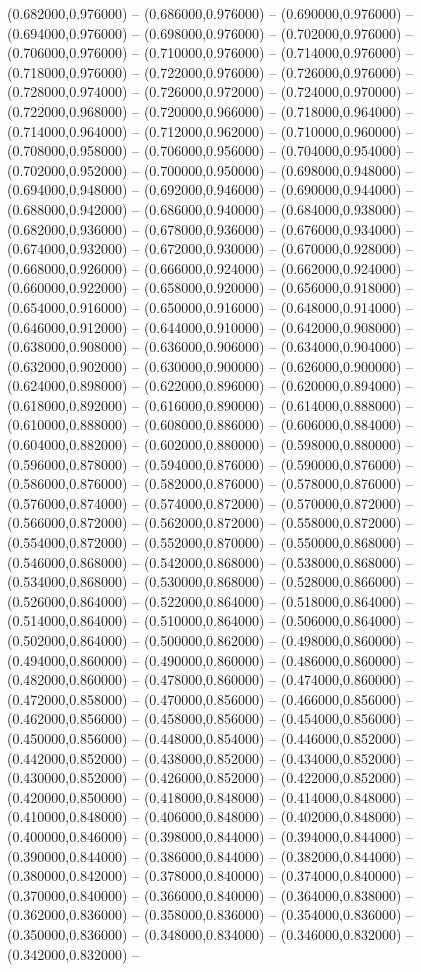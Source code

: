 (0.682000,0.976000) -- (0.686000,0.976000) -- (0.690000,0.976000) -- (0.694000,0.976000) -- (0.698000,0.976000) -- (0.702000,0.976000) -- (0.706000,0.976000) -- (0.710000,0.976000) -- (0.714000,0.976000) -- (0.718000,0.976000) -- (0.722000,0.976000) -- (0.726000,0.976000) -- (0.728000,0.974000) -- (0.726000,0.972000) -- (0.724000,0.970000) -- (0.722000,0.968000) -- (0.720000,0.966000) -- (0.718000,0.964000) -- (0.714000,0.964000) -- (0.712000,0.962000) -- (0.710000,0.960000) -- (0.708000,0.958000) -- (0.706000,0.956000) -- (0.704000,0.954000) -- (0.702000,0.952000) -- (0.700000,0.950000) -- (0.698000,0.948000) -- (0.694000,0.948000) -- (0.692000,0.946000) -- (0.690000,0.944000) -- (0.688000,0.942000) -- (0.686000,0.940000) -- (0.684000,0.938000) -- (0.682000,0.936000) -- (0.678000,0.936000) -- (0.676000,0.934000) -- (0.674000,0.932000) -- (0.672000,0.930000) -- (0.670000,0.928000) -- (0.668000,0.926000) -- (0.666000,0.924000) -- (0.662000,0.924000) -- (0.660000,0.922000) -- (0.658000,0.920000) -- (0.656000,0.918000) -- (0.654000,0.916000) -- (0.650000,0.916000) -- (0.648000,0.914000) -- (0.646000,0.912000) -- (0.644000,0.910000) -- (0.642000,0.908000) -- (0.638000,0.908000) -- (0.636000,0.906000) -- (0.634000,0.904000) -- (0.632000,0.902000) -- (0.630000,0.900000) -- (0.626000,0.900000) -- (0.624000,0.898000) -- (0.622000,0.896000) -- (0.620000,0.894000) -- (0.618000,0.892000) -- (0.616000,0.890000) -- (0.614000,0.888000) -- (0.610000,0.888000) -- (0.608000,0.886000) -- (0.606000,0.884000) -- (0.604000,0.882000) -- (0.602000,0.880000) -- (0.598000,0.880000) -- (0.596000,0.878000) -- (0.594000,0.876000) -- (0.590000,0.876000) -- (0.586000,0.876000) -- (0.582000,0.876000) -- (0.578000,0.876000) -- (0.576000,0.874000) -- (0.574000,0.872000) -- (0.570000,0.872000) -- (0.566000,0.872000) -- (0.562000,0.872000) -- (0.558000,0.872000) -- (0.554000,0.872000) -- (0.552000,0.870000) -- (0.550000,0.868000) -- (0.546000,0.868000) -- (0.542000,0.868000) -- (0.538000,0.868000) -- (0.534000,0.868000) -- (0.530000,0.868000) -- (0.528000,0.866000) -- (0.526000,0.864000) -- (0.522000,0.864000) -- (0.518000,0.864000) -- (0.514000,0.864000) -- (0.510000,0.864000) -- (0.506000,0.864000) -- (0.502000,0.864000) -- (0.500000,0.862000) -- (0.498000,0.860000) -- (0.494000,0.860000) -- (0.490000,0.860000) -- (0.486000,0.860000) -- (0.482000,0.860000) -- (0.478000,0.860000) -- (0.474000,0.860000) -- (0.472000,0.858000) -- (0.470000,0.856000) -- (0.466000,0.856000) -- (0.462000,0.856000) -- (0.458000,0.856000) -- (0.454000,0.856000) -- (0.450000,0.856000) -- (0.448000,0.854000) -- (0.446000,0.852000) -- (0.442000,0.852000) -- (0.438000,0.852000) -- (0.434000,0.852000) -- (0.430000,0.852000) -- (0.426000,0.852000) -- (0.422000,0.852000) -- (0.420000,0.850000) -- (0.418000,0.848000) -- (0.414000,0.848000) -- (0.410000,0.848000) -- (0.406000,0.848000) -- (0.402000,0.848000) -- (0.400000,0.846000) -- (0.398000,0.844000) -- (0.394000,0.844000) -- (0.390000,0.844000) -- (0.386000,0.844000) -- (0.382000,0.844000) -- (0.380000,0.842000) -- (0.378000,0.840000) -- (0.374000,0.840000) -- (0.370000,0.840000) -- (0.366000,0.840000) -- (0.364000,0.838000) -- (0.362000,0.836000) -- (0.358000,0.836000) -- (0.354000,0.836000) -- (0.350000,0.836000) -- (0.348000,0.834000) -- (0.346000,0.832000) -- (0.342000,0.832000) -- 